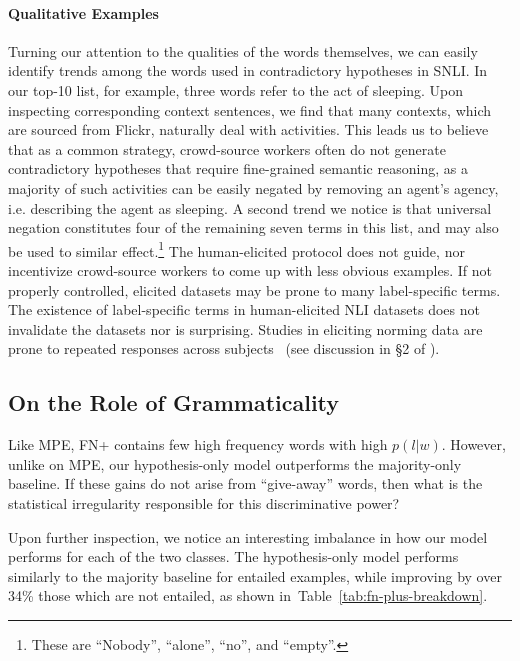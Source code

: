  \paragraph{Qualitative Examples} Turning our attention to the qualities of the words themselves, we can easily identify trends among the words used in contradictory hypotheses in SNLI.  In our top-10 list, for example, three words refer to the act of sleeping.  Upon inspecting corresponding context sentences, we find that many contexts, which are sourced from Flickr, naturally deal with activities.  This leads us to believe that as a common strategy, crowd-source workers often do not generate contradictory hypotheses that require fine-grained semantic reasoning, as a majority of such activities can be easily negated by removing an agent's agency, i.e. describing the agent as sleeping. A second trend we notice is that universal negation constitutes four of the remaining seven terms in this list, and may also be used to similar effect.\footnote{These are ``Nobody'', ``alone'', ``no'', and ``empty''.} The human-elicited protocol does not guide, nor incentivize crowd-source workers to come up with less obvious examples. If not properly controlled, elicited datasets may be prone to many label-specific terms. The existence of label-specific terms in human-elicited NLI datasets does not invalidate the datasets nor is surprising. Studies in eliciting norming data are prone to repeated responses across subjects~\cite{mcrae2005semantic} (see discussion in \S 2 of \cite{TACL1082}).

\subsection{On the Role of Grammaticality} Like MPE, FN+ contains few high frequency words with high $p(l|w)$. However, unlike on MPE, our hypothesis-only model outperforms the majority-only baseline.  If these gains do not arise from ``give-away'' words, then what is the statistical irregularity responsible for this discriminative power?

Upon further inspection, we notice an interesting imbalance in how our model performs for each of the two classes. The hypothesis-only model performs similarly to the majority baseline for entailed examples, while improving by over 34\% those which are not entailed, as shown in~Table~\ref{tab:fn-plus-breakdown}.

